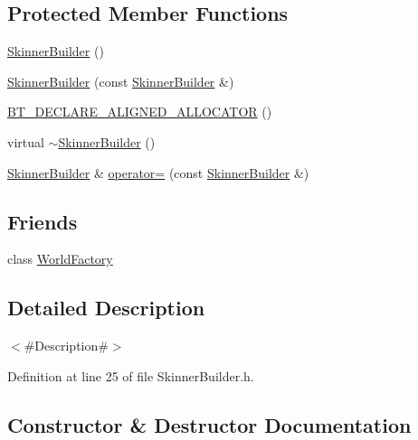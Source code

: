 \subsection*{Protected Member Functions}
\begin{DoxyCompactItemize}
\item 
\mbox{\hyperlink{classnjli_1_1_skinner_builder_ad550292245e00cf9018ef51d8a793b79}{Skinner\+Builder}} ()
\item 
\mbox{\hyperlink{classnjli_1_1_skinner_builder_a400b16ca147c44e5a8afe3d9fa4731f8}{Skinner\+Builder}} (const \mbox{\hyperlink{classnjli_1_1_skinner_builder}{Skinner\+Builder}} \&)
\item 
\mbox{\hyperlink{classnjli_1_1_skinner_builder_a0b5e02d1a83e879b816c3acaca0b4a62}{B\+T\+\_\+\+D\+E\+C\+L\+A\+R\+E\+\_\+\+A\+L\+I\+G\+N\+E\+D\+\_\+\+A\+L\+L\+O\+C\+A\+T\+OR}} ()
\item 
virtual \mbox{\hyperlink{classnjli_1_1_skinner_builder_a359bb318d5f7d2f9118ecf96efb95745}{$\sim$\+Skinner\+Builder}} ()
\item 
\mbox{\hyperlink{classnjli_1_1_skinner_builder}{Skinner\+Builder}} \& \mbox{\hyperlink{classnjli_1_1_skinner_builder_af133f1d86503b5839870ba8d16c83ec5}{operator=}} (const \mbox{\hyperlink{classnjli_1_1_skinner_builder}{Skinner\+Builder}} \&)
\end{DoxyCompactItemize}
\subsection*{Friends}
\begin{DoxyCompactItemize}
\item 
class \mbox{\hyperlink{classnjli_1_1_skinner_builder_acb96ebb09abe8f2a37a915a842babfac}{World\+Factory}}
\end{DoxyCompactItemize}


\subsection{Detailed Description}
$<$\#\+Description\#$>$ 

Definition at line 25 of file Skinner\+Builder.\+h.



\subsection{Constructor \& Destructor Documentation}
\mbox{\label{classnjli_1_1_skinner_builder_ad550292245e00cf9018ef51d8a793b79}} 
